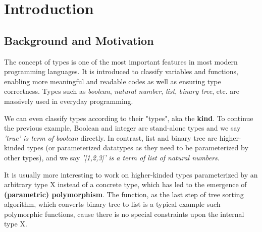 \chapter{Introduction}

\section{Background and Motivation}

The concept of types is one of the most important features in most modern programming languages. It is introduced to classify variables and functions, enabling more meaningful and readable codes as well as ensuring type correctness. Types such as \textit{boolean}, \textit{natural number}, \textit{list}, \textit{binary tree}, etc. are massively used in everyday programming.

We can even classify types according to their "types", aka the \textbf{kind}. To continue the previous example, Boolean and integer are stand-alone types and we say \textit{'true' is term of boolean} directly. In contrast, list and binary tree are higher-kinded types (or parameterized datatypes as they need to be parameterized by other types), and we say \textit{'[1,2,3]' is a term of list of natural numbers}.

It is usually more interesting to work on higher-kinded types parameterized by an arbitrary type X instead of a concrete type, which has led to the emergence of \textbf{(parametric) polymorphism}. The  function, as the last step of tree sorting algorithm, which converts binary tree to list is a typical example such polymorphic functions, cause there is no special constraints upon the internal type X.

\begin{code}[hide]%
\>[0]\AgdaSpace{}%
\AgdaSpace{}%
\<%
\\
%
\\[\AgdaEmptyExtraSkip]%
\>[0]\AgdaSpace{}%
\AgdaSpace{}%
\AgdaSymbol{:}\AgdaSpace{}%
\<%
\\
%
\\[\AgdaEmptyExtraSkip]%
\>[0]\AgdaSpace{}%
\AgdaSpace{}%
\AgdaSymbol{(}\AgdaSpace{}%
\AgdaSymbol{:}\AgdaSpace{}%
\AgdaSymbol{)}\AgdaSpace{}%
\AgdaSymbol{:}\AgdaSpace{}%
\AgdaSpace{}%
\<%
\\
\>[0][@{}l@{\AgdaIndent{0}}]%
\>[2]\AgdaSpace{}%
\AgdaSymbol{:}\AgdaSpace{}%
\AgdaSpace{}%
\<%
\\
%
\>[2]\AgdaSpace{}%
\AgdaSymbol{:}\AgdaSpace{}%
\AgdaSpace{}%
\AgdaSpace{}%
\AgdaSpace{}%
\AgdaSpace{}%
\AgdaSpace{}%
\AgdaSpace{}%
\AgdaSpace{}%
\AgdaSpace{}%
\AgdaSpace{}%
\<%
\end{code}

